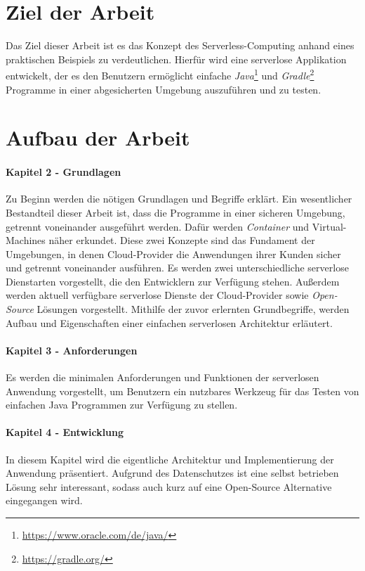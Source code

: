 \section{Ziel der Arbeit}
Das Ziel dieser Arbeit ist es das Konzept des Serverless-Computing anhand eines praktischen
Beispiels zu verdeutlichen. Hierfür wird eine serverlose Applikation entwickelt,
der es den Benutzern ermöglicht einfache
\textit{Java}\footnote{\url{https://www.oracle.com/de/java/}}
und \textit{Gradle}\footnote{\url{https://gradle.org/}} Programme in einer
abgesicherten Umgebung auszuführen und zu testen.

\section{Aufbau der Arbeit}
\paragraph{Kapitel 2 - Grundlagen} Zu Beginn werden die nötigen Grundlagen und Begriffe erklärt.
Ein wesentlicher Bestandteil dieser Arbeit ist, dass die Programme in einer sicheren Umgebung,
getrennt voneinander ausgeführt werden. Dafür werden
\textit{Container} und Virtual-Machines 
näher erkundet. Diese zwei Konzepte sind das Fundament der Umgebungen, in denen Cloud-Provider die 
Anwendungen ihrer Kunden sicher und getrennt voneinander ausführen.
Es werden zwei unterschiedliche serverlose Dienstarten vorgestellt, die den Entwicklern zur Verfügung stehen.
Außerdem werden aktuell verfügbare serverlose Dienste der Cloud-Provider sowie \textit{Open-Source} 
Lösungen vorgestellt. Mithilfe der zuvor erlernten Grundbegriffe, werden Aufbau und 
Eigenschaften einer einfachen serverlosen Architektur erläutert.

\paragraph{Kapitel 3 - Anforderungen} Es werden die minimalen Anforderungen und Funktionen
der serverlosen Anwendung vorgestellt, um Benutzern ein nutzbares Werkzeug
für das Testen von einfachen Java Programmen zur Verfügung zu stellen.

\paragraph{Kapitel 4 - Entwicklung} In diesem Kapitel wird die eigentliche Architektur
und Implementierung der Anwendung präsentiert. Aufgrund des Datenschutzes ist eine
selbst betrieben Lösung sehr interessant, sodass auch kurz auf eine Open-Source Alternative eingegangen wird.

